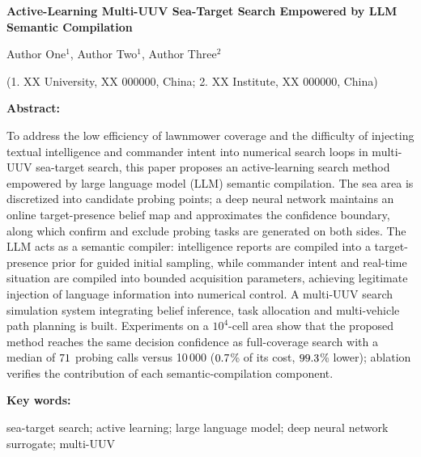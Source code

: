 \documentclass[a4paper,UTF8,zihao=5,twocolumn]{ctexart}
\numberwithin{equation}{section}
\begin{document}
\vspace{12pt}
\begin{center}
  {\bfseries Active-Learning Multi-UUV Sea-Target Search Empowered by LLM Semantic Compilation\par}
  \vspace{8pt}
  { Author One$^{1}$, Author Two$^{1}$, Author Three$^{2}$\par}
  \vspace{4pt}
  { (1. XX University, XX 000000, China; 2. XX Institute, XX 000000, China)\par}
\end{center}
{\sffamily\bfseries Abstract: }{
To address the low efficiency of lawnmower coverage and the difficulty of injecting textual intelligence and commander intent into numerical search loops in multi-UUV sea-target search, this paper proposes an active-learning search method empowered by large language model (LLM) semantic compilation. The sea area is discretized into candidate probing points; a deep neural network maintains an online target-presence belief map and approximates the confidence boundary, along which confirm and exclude probing tasks are generated on both sides. The LLM acts as a semantic compiler: intelligence reports are compiled into a target-presence prior for guided initial sampling, while commander intent and real-time situation are compiled into bounded acquisition parameters, achieving legitimate injection of language information into numerical control. A multi-UUV search simulation system integrating belief inference, task allocation and multi-vehicle path planning is built. Experiments on a $10^4$-cell area show that the proposed method reaches the same decision confidence as full-coverage search with a median of $71$ probing calls versus 10\,000 ($0.7$\% of its cost, $99.3$\% lower); ablation verifies the contribution of each semantic-compilation component.
\par}
\vspace{4pt}
{\sffamily\bfseries Key words: }{ sea-target search; active learning; large language model; deep neural network surrogate; multi-UUV\par}
\end{document}
